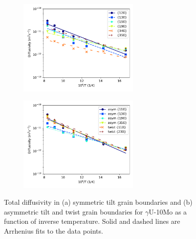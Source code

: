 \documentclass{elsarticle}
\begin{document}
\begin{figure}[!ht]
\begin{subfigure}{\textwidth}
	\centering
	\caption{}
	\includegraphics[width=0.65\textwidth]{u10mo_lin.pdf}
\end{subfigure}

\begin{subfigure}{\textwidth}
	\centering
	\caption{}
	\includegraphics[width=0.65\textwidth]{asym_twist_lin.pdf}
\end{subfigure}
\caption{Total diffusivity in (a) symmetric tilt grain boundaries and (b) asymmetric tilt and twist grain boundaries for $\gamma$U-10Mo as a function of inverse temperature. Solid and dashed lines are Arrhenius fits to the data points.}
\label{fig:u10mo}
\end{figure}
\end{document}
